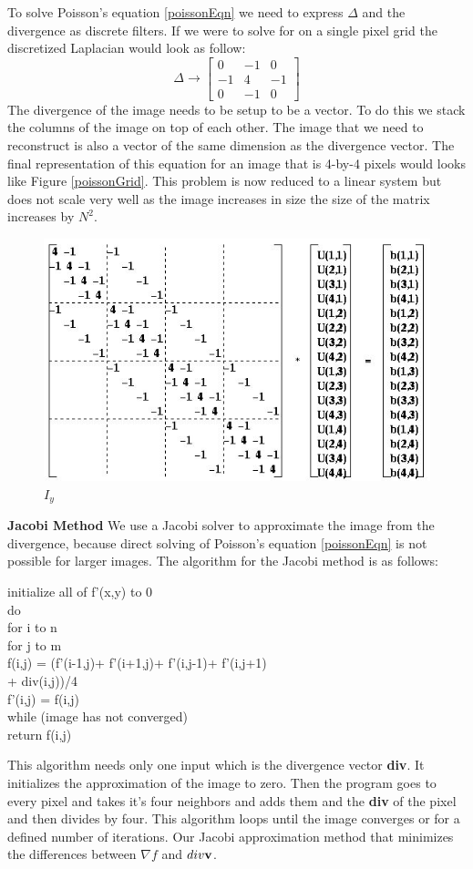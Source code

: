 \documentclass[10pt,twopage]{acmsiggraph}
\begin{document}
To solve Poisson's equation \ref{poissonEqn} we need to express \ensuremath{\Delta} and the divergence as discrete filters. If we were to solve for on a single pixel grid the discretized Laplacian would look as follow:
\begin{equation}
\label{lapDes}
\Delta \rightarrow  
\left[\begin{array}{ccc}
0 & -1 & 0 \\
-1 & 4 & -1 \\
0 & -1 & 0 \end{array}\right]
\end{equation}
The divergence of the image needs to be setup to be a vector. To do this we stack the columns of the image on top of each other. The image that we need to reconstruct is also a vector of the same dimension as the divergence vector. The final representation of this equation for an image that is 4-by-4 pixels would looks like Figure \ref{poissonGrid}. This problem is now reduced to a linear system but does not scale very well as the image increases in size the size of the matrix increases by $N^2$. 

\begin{figure}%
\centering
\includegraphics[width=.44\textwidth]{fig/matrix.jpg}
\caption{\ensuremath{I_{y}}}
\label{A 4-by-4 image setup as a Discrete Poisson Problem}
\end{figure}


{\bf Jacobi Method}
We use a Jacobi solver to approximate the image from the divergence, because direct solving of Poisson's equation \ref{poissonEqn} is not possible for larger images. The algorithm for the Jacobi method is as follows:

\begin{tabbing}
initialize all of f'(x,y) to 0\\
do \= \\
\> for i to n \= \\
\>\> for j to m\=\\
\>  \> f(i,j) = (f'(i-1,j)+ f'(i+1,j)+ f'(i,j-1)+ f'(i,j+1)\\
\> \>      \>       + div(i,j))/4 \\
f'(i,j) = f(i,j)\\
while (image has not converged) \\
return f(i,j)
\end{tabbing}
This algorithm needs only one input which is the divergence vector {\bf div}. It initializes the approximation of the image to zero. Then the program goes to every pixel and takes it's four neighbors and adds them and the {\bf div} of the pixel and then divides by four. This algorithm loops until the image converges or for a defined number of iterations. Our Jacobi approximation method that minimizes the differences between $\nabla f$ and $div{\bf v}$.
\end{document}
